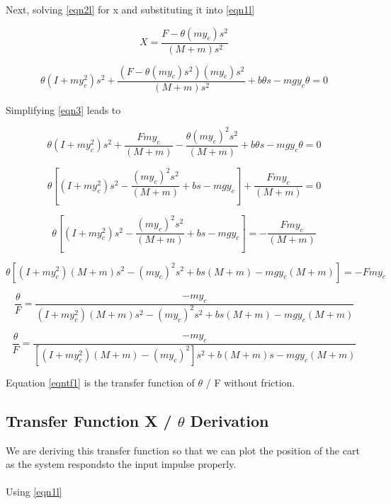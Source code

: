\documentclass{article}
\begin{document}
Next, solving \ref{eqn2l} for x and substituting it into \ref{eqn1l}

\begin{equation}  
\label{eqn2lb}
X = \frac{F - \theta (m y_c) s^2}{(M+m) s^2}
\end{equation}

\begin{equation} 
\label{eqn3}
\theta (I+m y_c^2) s^2+ \frac{(F - \theta (m y_c) s^2)(m y_c) s^2}{(M+m) s^2} + b \theta s - m g y_c \theta = 0 
\end{equation}

Simplifying \ref{eqn3} leads to


\begin{equation} 
\label{eqn3}
\theta (I+m y_c^2) s^2+ \frac{F m y_c}{(M+m)} -\frac{\theta (m y_c)^2 s^2}{(M+m)} + b \theta s - m g y_c \theta = 0 
\end{equation}

\begin{equation} 
\label{eqn3b}
\theta [(I+m y_c^2) s^2 - \frac{(m y_c)^2 s^2}{(M+m)} + b s - m g y_c] +\frac{F m y_c}{(M+m)}  = 0 
\end{equation}

\begin{equation} 
\label{eqn3c}
\theta [(I+m y_c^2) s^2 - \frac{(m y_c)^2 s^2}{(M+m)} + b s - m g y_c] = -\frac{F m y_c}{(M+m)} 
\end{equation}

\begin{equation} 
\label{eqn3d}
\theta [(I+m y_c^2)(M+m) s^2 - (m y_c)^2 s^2 + b s (M+m) - m g y_c (M+m) ] = -F m y_c
\end{equation}

\begin{equation} 
\label{eqn3e}
\frac{\theta}{F} = \frac{-m y_c}{(I+m y_c^2)(M+m) s^2 - (m y_c)^2 s^2 + b s (M+m) - m g y_c (M+m)}
\end{equation}

\begin{equation} 
\label{eqntf1}
\frac{\theta}{F} = \frac{-m y_c}{[(I+m y_c^2)(M+m) - (m y_c)^2]s^2 + b (M+m) s - m g y_c (M+m)}
\end{equation}

Equation \ref{eqntf1} is the transfer function of $\theta$ / F without friction.

\subsection{Transfer Function X / $\theta$ Derivation}
We are deriving this transfer function so that we can plot the position of the cart as the system respondsto the input impulse properly.
\\
\\
Using \ref{eqn1l}
\end{document}
